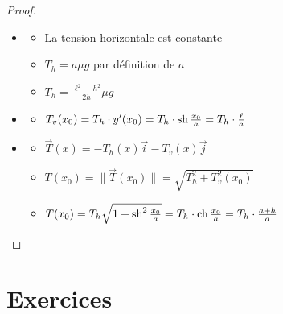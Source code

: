 \begin{frame}

\begin{proof}
\hfill \begin{minipage}{0.40\textwidth}
\shorthandoff{:}
\shorthandon{:}  
\end{minipage}

\pause
\vspace*{-20ex}
\begin{itemize}
  \item {}
  \pause
  \begin{itemize}
    \item La tension horizontale est constante
    \pause
    \item $T_h = a \mu g$ par définition de $a$
    \pause
    \item $T_h = \frac{\ell^2-h^2}{2h} \mu g$
  \end{itemize}
  
  \pause
  \item {}
  \pause
   \begin{itemize}
     \item $T_v(x_0) = T_h \cdot y'(x_0) =
  T_h \cdot \mathop{\text{sh}}\nolimits \frac{x_0}{a} = T_h \cdot \frac \ell a$
  \end{itemize}
 
 \pause
  \item {}
  \begin{itemize} 
  \pause
    \item $\vec T(x) = -T_h(x)\vec i - T_v(x) \vec j$
    \pause
    \item $T(x_0) = \|\vec T(x_0) \|   = \sqrt{T_h^2+T_v^2(x_0)}$
  \pause
   \item $T(x_0) = T_h \sqrt{1+\mathop{\text{sh}}\nolimits^2 \frac{x_0}{a}}
  = T_h \cdot \mathop{\text{ch}}\nolimits \frac{x_0}{a} = T_h \cdot \frac{a+h}{a}$
   
  \end{itemize}
\end{itemize}

\end{proof}
\end{frame}


\section{Exercices}

